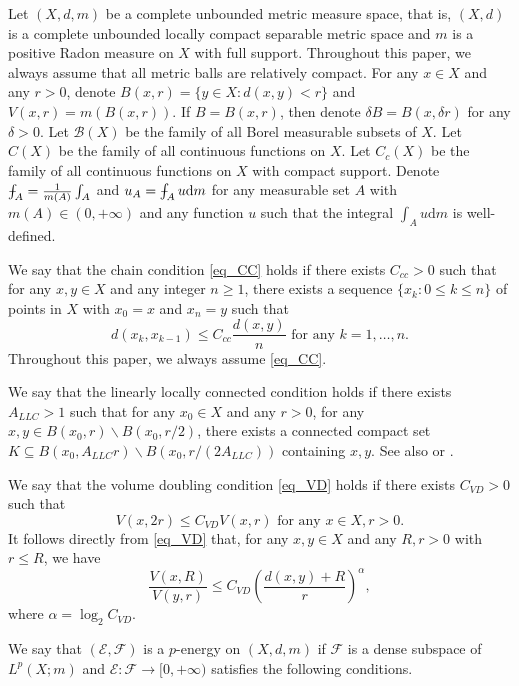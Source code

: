\documentclass[11pt,a4paper]{article}
\numberwithin{equation}{section}
\def\Xint#1{\mathchoice
{\XXint\displaystyle\textstyle{#1}}%
{\XXint\textstyle\scriptstyle{#1}}%
{\XXint\scriptstyle\scriptscriptstyle{#1}}%
{\XXint\scriptscriptstyle\scriptscriptstyle{#1}}%
\!\int}
\def\XXint#1#2#3{{\setbox0=\hbox{$#1{#2#3}{\int}$ }
\vcenter{\hbox{$#2#3$ }}\kern-.6\wd0}}
\def\dashint{\Xint-}
\theoremstyle{plain}
\theoremstyle{definition}
\begin{document}
Let $(X,d,m)$ be a complete unbounded metric measure space, that is, $(X,d)$ is a complete unbounded locally compact separable metric space and $m$ is a positive Radon measure on $X$ with full support. Throughout this paper, we always assume that all metric balls are relatively compact. For any $x\in X$ and any $r>0$, denote $B(x,r)=\{y\in X:d(x,y)<r\}$ and $V(x,r)=m(B(x,r))$. If $B=B(x,r)$, then denote $\delta B=B(x,\delta r)$ for any $\delta>0$. Let $\mathcal{B}(X)$ be the family of all Borel measurable subsets of $X$. Let $C(X)$ be the family of all continuous functions on $X$. Let $C_c(X)$ be the family of all continuous functions on $X$ with compact support. Denote $\dashint_A=\frac{1}{m(A)}\int_A$ and $u_A=\dashint_Au\mathrm{d} m$ for any measurable set $A$ with $m(A)\in(0,+\infty)$ and any function $u$ such that the integral $\int_Au\mathrm{d} m$ is well-defined.

We say that the chain condition \ref{eq_CC} holds if there exists $C_{cc}>0$ such that for any $x,y\in X$ and any integer $n\ge1$, there exists a sequence $\{x_k:0\le k\le n\}$ of points in $X$ with $x_0=x$ and $x_n=y$ such that
\begin{equation*}\label{eq_CC}\tag*{CC}
d(x_k,x_{k-1})\le C_{cc} \frac{d(x,y)}{n}\text{ for any }k=1,\ldots,n.
\end{equation*}
Throughout this paper, we always assume \ref{eq_CC}.

We say that the linearly locally connected condition \hypertarget{eq_LLC}{} holds if there exists $A_{LLC}>1$ such that for any $x_0\in X$ and any $r>0$, for any $x,y\in B(x_0,r)\backslash B(x_0,r/2)$, there exists a connected compact set $K\subseteq B(x_0,A_{LLC}r)\backslash B(x_0,r/(2A_{LLC}))$ containing $x,y$. See also \cite[3.12]{HK98} or \cite[Page 234]{HKST15}.

We say that the volume doubling condition \ref{eq_VD} holds if there exists $C_{VD}>0$ such that
\begin{equation*}\label{eq_VD}\tag*{VD}
V(x,2r)\le C_{VD}V(x,r)\text{ for any }x\in X,r>0.
\end{equation*}
It follows directly from \ref{eq_VD} that, for any $x,y\in X$ and any $R,r>0$ with $r\le R$, we have
\begin{equation}\label{eq_VDa}
\frac{V(x,R)}{V(y,r)}\le C_{VD} \left(\frac{d(x,y)+R}{r}\right)^{\alpha},
\end{equation}
where $\alpha=\log_2C_{VD}$.

We say that $(\mathcal{E},\mathcal{F})$ is a $p$-energy on $(X,d,m)$ if $\mathcal{F}$ is a dense subspace of $L^p(X;m)$ and $\mathcal{E}:\mathcal{F}\to[0,+\infty)$ satisfies the following conditions.
\end{document}

